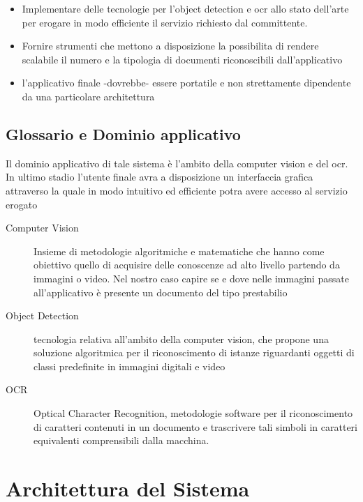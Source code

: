 \documentclass[12pt,a4paper]{article}
\begin{document}
\begin{itemize}
    \item Implementare delle tecnologie per l'object detection e ocr allo stato dell'arte per
    erogare in modo efficiente il servizio richiesto dal committente.
    \item Fornire strumenti che mettono a disposizione la possibilita di rendere scalabile il numero
    e la tipologia di documenti riconoscibili dall'applicativo
    \item l'applicativo finale -dovrebbe- essere portatile e non strettamente dipendente da una particolare architettura
\end{itemize}

\subsection{Glossario e Dominio applicativo}

Il dominio applicativo di tale sistema è l'ambito della computer vision e del ocr.
In ultimo stadio l'utente finale avra a disposizione un interfaccia grafica attraverso la quale
in modo intuitivo ed efficiente potra avere accesso al servizio erogato 

\begin{description}

    \item[Computer Vision] Insieme di metodologie algoritmiche e matematiche che hanno come obiettivo
    quello di acquisire delle conoscenze ad alto livello partendo da immagini o video. Nel nostro caso 
    capire se e dove nelle immagini passate all'applicativo è presente un documento del tipo prestabilio

    \item[Object Detection] tecnologia relativa all'ambito della computer vision, che propone una soluzione
    algoritmica per il riconoscimento di istanze riguardanti oggetti di classi predefinite in immagini digitali e video

    \item[OCR] Optical Character Recognition, metodologie software per il riconoscimento di caratteri contenuti in un documento
    e trascrivere tali simboli in caratteri equivalenti comprensibili dalla macchina.

\end{description}


\section{Architettura del Sistema}
\end{document}
